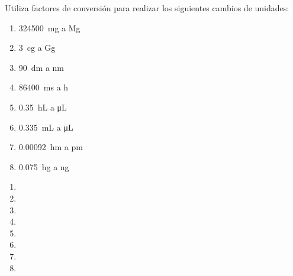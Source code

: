 

\begin{exercise}[
    tags    = {unidades, factores de conversión, conversión},
    topics  = {unidades, medida, física, química},
    source  = {MERES},
  ]
  Utiliza factores de conversión para realizar los siguientes cambios de unidades:
  \begin{multicols}{2}
    \begin{enumerate}
      \item \SI{324500}{\mg} a \si{\mega\g}
      \item \SI{3}{\centi\g} a \si{\giga\g}
      \item \SI{90}{\dm} a \si{\nm}
      \item \SI{86400}{\ms} a \si{\hour}
      \item \SI{0.35}{\hL} a \si{\uL}
      \item \SI{0.335}{\mL} a \si{\uL}
      \item \SI{0.00092}{\hecto\m} a \si{\pm}
      \item \SI{0.075}{\hecto\g} a \si{\ng}
    \end{enumerate}
  \end{multicols}
\end{exercise}

\begin{solution}
  \begin{enumerate}
    \item {}
    \item {}
    \item {}
    \item {}
    \item {}
    \item {}
    \item {}
    \item {}
  \end{enumerate}
\end{solution}



